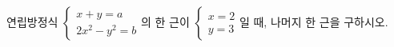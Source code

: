 연립방정식 $\begin{cases} x+y=a \\ 2x^2-y^2=b \end{cases}$의 한 근이 $\begin{cases} x=2 \\ y=3 \end{cases}$일 때, 나머지 한 근을 구하시오. 
